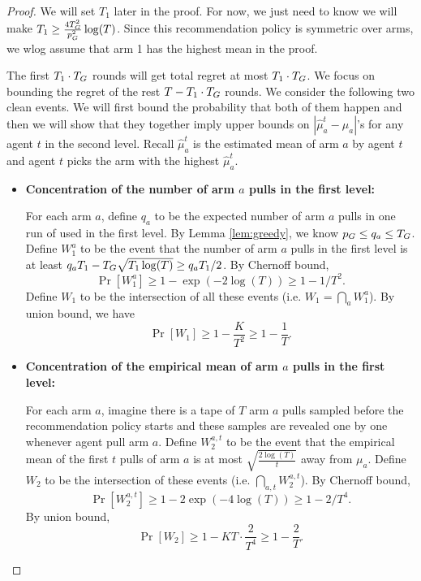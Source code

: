 \begin{proof}
We will set $T_1$ later in the proof. For now, we just need to know we will make $T_1 \geq \frac{4T_G^2}{p_G^2}\log(T)$. Since this recommendation policy is symmetric over arms, we wlog assume that arm 1 has the highest mean in the proof.

The first $T_1 \cdot T_G$ rounds will get total regret at most $T_1 \cdot T_G$.  We focus on bounding the regret of the rest $T - T_1 \cdot T_G$ rounds. We consider the following two clean events. We will first bound the probability that both of them happen and then we will show that they together imply upper bounds on $|\hat{\mu}^t_a - \mu_a|$'s for any agent $t$ in the second level. Recall $\hat{\mu}^t_a$ is the estimated mean of arm $a$ by agent $t$ and agent $t$ picks the arm with the highest $\hat{\mu}^t_a$.

\begin{itemize}
\item \textbf{Concentration of the number of arm $a$ pulls in the first level:} 

  For each arm $a$, define $q_a$ to be the expected number of arm $a$
  pulls in one run of \ALGG used in the first level. 
    By Lemma
  \ref{lem:greedy}, we know $p_G \leq q_a \leq
  T_G$.
   Define $W_1^a$ to be the event that the
  number of arm $a$ pulls in the first level is at least
  $q_a T_1- T_G \sqrt{T_1\log(T)} \geq q_a T_1 / 2$. 
    By Chernoff
  bound,
\[
\Pr[W_1^a] \geq 1-\exp(-2\log(T)) \geq 1-1/T^2.
\]
Define $W_1$ to be the intersection of all these events (i.e. $W_1 = \bigcap_{a}W_1^a$). By union bound, we have
\[
\Pr[W_1] \geq 1- \frac{K}{T^2} \geq 1 - \frac{1}{T}.
\]
\item  \textbf{Concentration of the empirical mean of arm $a$ pulls in the first level:}

For each arm $a$, imagine there is a tape of $T$ arm $a$ pulls sampled before the recommendation policy starts and these samples are revealed one by one whenever agent pull arm $a$. Define $W^{a,t}_2$ to be the event that the empirical mean of the first $t$ pulls of arm $a$ is at most $\sqrt{\frac{2\log(T)}{t}}$ away from $\mu_a$. Define $W_2$ to be the intersection of these events (i.e. $\bigcap_{a,t} W^{a,t}_2$).
By Chernoff bound,
\[
\Pr[W^{a,t}_2] \geq 1 - 2\exp(-4\log(T)) \geq 1-2/T^4.
\]
By union bound, 
\[
\Pr[W_2] \geq 1 - KT \cdot \frac{2}{T^4} \geq 1 - \frac{2}{T}.
\]
\end{itemize}


\end{proof}
